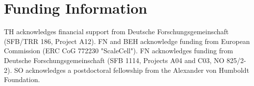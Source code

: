 \documentclass[9pt,tutorial]{livecoms}
\begin{document}
\section{Funding Information}
TH acknowledges financial support from Deutsche Forschungsgemeinschaft (SFB/TRR 186, Project A12).
FN and BEH acknowledge funding from European Commission (ERC CoG 772230 "ScaleCell").
FN acknowledges funding from Deutsche Forschungsgemeinschaft (SFB 1114, Projects A04 and C03, NO 825/2-2).
SO acknowledges a postdoctoral fellowship from the Alexander von Humboldt Foundation.




\end{document}
